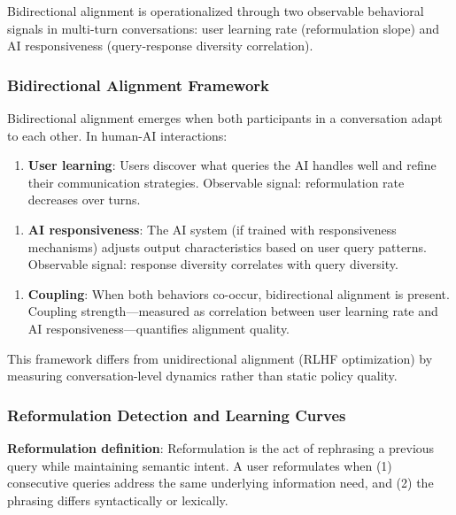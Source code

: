 
Bidirectional alignment is operationalized through two observable behavioral signals in multi-turn conversations: user learning rate (reformulation slope) and AI responsiveness (query-response diversity correlation).

\subsubsection{Bidirectional Alignment Framework}

Bidirectional alignment emerges when both participants in a conversation adapt to each other. In human-AI interactions:

\begin{enumerate}
\item \textbf{User learning}: Users discover what queries the AI handles well and refine their communication strategies. Observable signal: reformulation rate decreases over turns.
\end{enumerate}

\begin{enumerate}
\item \textbf{AI responsiveness}: The AI system (if trained with responsiveness mechanisms) adjusts output characteristics based on user query patterns. Observable signal: response diversity correlates with query diversity.
\end{enumerate}

\begin{enumerate}
\item \textbf{Coupling}: When both behaviors co-occur, bidirectional alignment is present. Coupling strength---measured as correlation between user learning rate and AI responsiveness---quantifies alignment quality.
\end{enumerate}

This framework differs from unidirectional alignment (RLHF optimization) by measuring conversation-level dynamics rather than static policy quality.

\subsubsection{Reformulation Detection and Learning Curves}

\textbf{Reformulation definition}: Reformulation is the act of rephrasing a previous query while maintaining semantic intent. A user reformulates when (1) consecutive queries address the same underlying information need, and (2) the phrasing differs syntactically or lexically.

